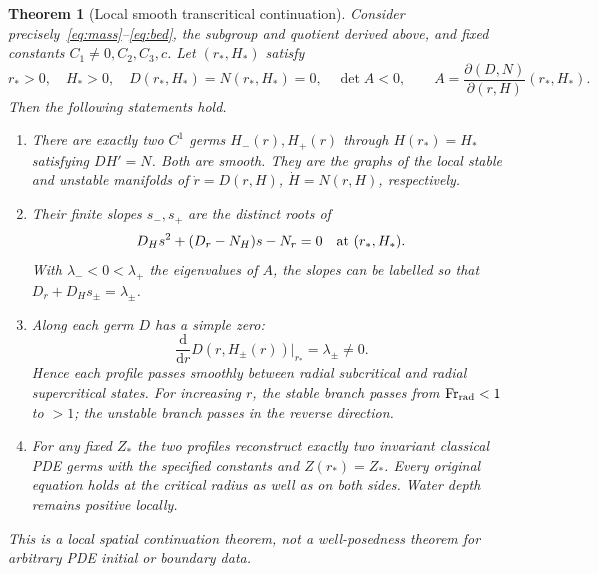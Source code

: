 \documentclass[11pt]{article}
\newtheorem{theorem}{Theorem}
\theoremstyle{remark}\newtheorem{remark}[theorem]{Remark}
\begin{document}
\begin{theorem}[Local smooth transcritical continuation]\label{thm:main}
Consider precisely~\eqref{eq:mass}--\eqref{eq:bed}, the subgroup and quotient
derived above, and fixed constants $C_1\ne0,C_2,C_3,c$. Let $(r_*,H_*)$ satisfy
\begin{equation}
r_*>0,\quad H_*>0,\quad D(r_*,H_*)=N(r_*,H_*)=0,\quad
\det A<0,\qquad
A=\frac{\partial(D,N)}{\partial(r,H)}(r_*,H_*).\label{eq:hyp}
\end{equation}
Then the following statements hold.
\begin{enumerate}
\item There are exactly two $C^1$ germs $H_-(r),H_+(r)$ through
      $H(r_*)=H_*$ satisfying $DH'=N$. Both are smooth. They are the graphs
      of the local stable and unstable manifolds of
      $\dot r=D(r,H)$, $\dot H=N(r,H)$, respectively.
\item Their finite slopes $s_-,s_+$ are the distinct roots of
\begin{equation}
D_Hs^2+(D_r-N_H)s-N_r=0\quad\hbox{at }(r_*,H_*).\label{eq:slopes}
\end{equation}
      With $\lambda_-<0<\lambda_+$ the eigenvalues of $A$, the slopes can
      be labelled so that $D_r+D_Hs_\pm=\lambda_\pm$.
\item Along each germ $D$ has a simple zero:
\begin{equation}
\frac{\mathrm d}{\mathrm d r}D(r,H_\pm(r))\big|_{r_*}=\lambda_\pm\ne0.\label{eq:cross}
\end{equation}
      Hence each profile passes smoothly between radial subcritical and
      radial supercritical states. For increasing $r$, the stable branch
      passes from $\mathrm{Fr}_{\rm rad}<1$ to $>1$; the unstable branch
      passes in the reverse direction.
\item For any fixed $Z_*$ the two profiles reconstruct exactly two invariant
      classical PDE germs with the specified constants and $Z(r_*)=Z_*$.
      Every original equation holds at the critical radius as well as on
      both sides. Water depth remains positive locally.
\end{enumerate}
This is a local spatial continuation theorem, not a well-posedness theorem
for arbitrary PDE initial or boundary data.
\end{theorem}
\end{document}
